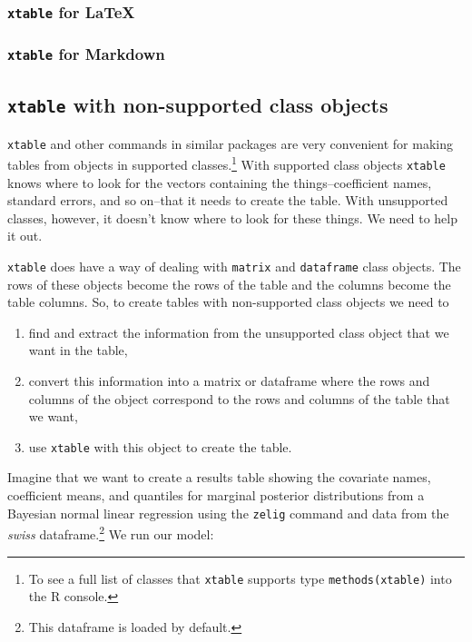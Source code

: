 \documentclass[ChapterTOCs,krantz1]{krantz}\usepackage{graphicx, color}
\begin{document}
\subsubsection{\texttt{xtable} for \LaTeX}

\subsubsection{\texttt{xtable} for Markdown}

\subsection{\texttt{xtable} with non-supported class objects}

{\tt{xtable}} and other commands in similar packages are very convenient for making tables from objects in supported classes.\footnote{To see a full list of classes that {\tt{xtable}} supports type {\tt{methods(xtable)}} into the R console.} With supported class objects {\tt{xtable}} knows where to look for the vectors containing the things--coefficient names, standard errors, and so on--that it needs to create the table. With unsupported classes, however, it doesn't know where to look for these things. We need to help it out. 

{\tt{xtable}} does have a way of dealing with {\tt{matrix}} and {\tt{dataframe}} class objects. The rows of these objects become the rows of the table and the columns become the table columns. So, to create tables with non-supported class objects we need to

\begin{enumerate}
    \item find and extract the information from the unsupported class object that we want in the table, 
    \item convert this information into a matrix or dataframe where the rows and columns of the object correspond to the rows and columns of the table that we want,
    \item use {\tt{xtable}} with this object to create the table.
\end{enumerate}

Imagine that we want to create a results table showing the covariate names, coefficient means, and quantiles for marginal posterior distributions from a Bayesian normal linear regression using the {\tt{zelig}} command \cite{Goodrich2007} and data from the {\emph{swiss}} dataframe.\footnote{This dataframe is loaded by default.} We run our model:
\end{document}
